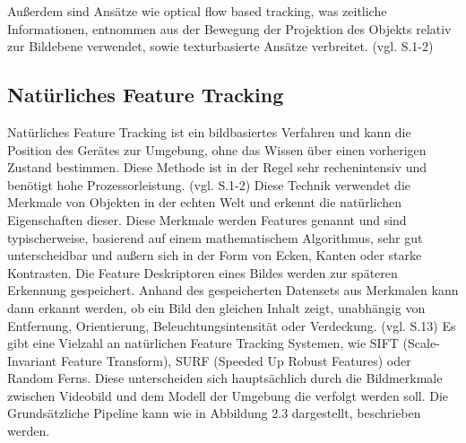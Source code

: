 Außerdem sind Ansätze wie \glqq optical flow based tracking\grqq{}, was zeitliche Informationen, entnommen aus der Bewegung der Projektion des Objekts relativ zur Bildebene verwendet, sowie texturbasierte Ansätze verbreitet. (vgl. \cite{model_based} S.1-2)



\subsection{Natürliches Feature Tracking}

Natürliches Feature Tracking ist ein bildbasiertes Verfahren und kann die Position des Gerätes zur Umgebung, ohne das Wissen über einen vorherigen Zustand bestimmen. Diese Methode ist in der Regel sehr rechenintensiv und benötigt hohe Prozessorleistung. (vgl. \cite{model_based} S.1-2) Diese Technik verwendet die Merkmale von Objekten in der echten Welt und erkennt die natürlichen Eigenschaften dieser. Diese Merkmale werden Features genannt und sind typischerweise, basierend auf einem mathematischem Algorithmus, sehr gut unterscheidbar und außern sich in der Form von Ecken, Kanten oder starke Kontrasten. Die Feature Deskriptoren eines Bildes werden zur späteren Erkennung gespeichert. Anhand des gespeicherten Datensets aus Merkmalen kann dann erkannt werden, ob ein Bild den gleichen Inhalt zeigt, unabhängig von Entfernung, Orientierung, Beleuchtungsintensität oder Verdeckung. (vgl. \cite{comparative_sdks} S.13) Es gibt eine Vielzahl an natürlichen Feature Tracking Systemen, wie SIFT (Scale-Invariant Feature Transform), SURF (Speeded Up Robust Features) oder \glqq Random Ferns\grqq{}. Diese unterscheiden sich hauptsächlich durch die Bildmerkmale zwischen Videobild und dem Modell der Umgebung die verfolgt werden soll. Die Grundsätzliche Pipeline kann wie in Abbildung 2.3 dargestellt, beschrieben werden.

